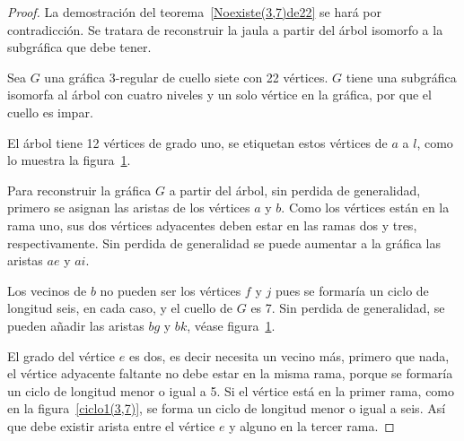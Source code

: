 \documentclass[12pt]{book}
\theoremstyle{definition}
\begin{document}
\begin{proof} La demostración del teorema~\ref{Noexiste(3,7)de22} se
  hará por contradicción. Se tratara de reconstruir la jaula a partir
  del árbol isomorfo a la subgráfica que debe tener.

Sea $G$ una gráfica 3-regular de cuello siete con 22 vértices. $G$
tiene una subgráfica isomorfa al árbol con cuatro niveles y un solo
vértice en la gráfica, por que el cuello es impar.

El árbol tiene 12 vértices de grado uno, se etiquetan estos vértices
de $a$ a $l$, como lo muestra la figura~\ref{arbol(3,7)}. 

Para reconstruir la gráfica $G$ a partir del árbol, sin perdida de generalidad, primero se asignan las aristas de los
vértices $a$ y $b$. Como los vértices están en la rama uno, sus dos
vértices adyacentes deben estar en las ramas dos y tres,
respectivamente. Sin perdida de generalidad se puede aumentar a la
gráfica las aristas $ae$ y $ai$. 

Los vecinos de $b$ no pueden ser los vértices $f$ y $j$ pues se
formaría un ciclo de longitud seis, en cada caso, y el cuello de $G$
es 7. Sin perdida de
generalidad, se pueden añadir las aristas $bg$ y $bk$, véase figura~\ref{arbol(3,7)}.

\begin{figure}
  \centering
  \caption{} \label{arbol(3,7)}
\end{figure}

El grado del vértice $e$  es dos, es decir necesita un
vecino más, primero que nada, el vértice adyacente faltante no debe
estar en la misma rama, porque se formaría un ciclo de longitud
menor o igual a 5. Si el vértice está en la primer rama, como en la
figura~\ref{ciclo1(3,7)}, se forma un ciclo de longitud menor o igual
a seis. Así que debe existir arista entre el vértice $e$ y alguno en
la tercer rama.


\end{proof}
\end{document}
